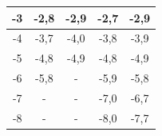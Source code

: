 \documentclass[a4paper,12pt]{article} %
\begin{document}
\begin{table}[H]
\begin{tabular}{|c|c|c|c|c|}
		-3 & -2,8             & -2,9                                  & -2,7                                  & -2,9                                  \\ \hline
		-4 & -3,7             & -4,0                                  & -3,8                                  & -3,9                                  \\ \hline
		-5 & -4,8             & -4,9                                  & -4,8                                  & -4,9                                  \\ \hline
		-6 & -5,8             & -                                     & -5,9                                  & -5,8                                  \\ \hline
		-7 & -                & -                                     & -7,0                                  & -6,7                                  \\ \hline
		-8 & -                & -                                     & -8,0                                  & -7,7                                  \\ \hline
	\end{tabular}
	\end{table}

\newpage
\end{document}

